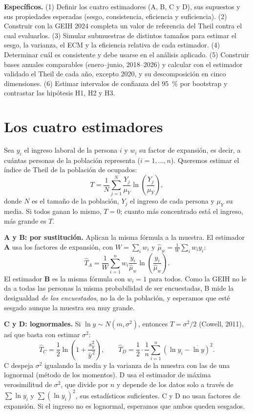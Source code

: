 \documentclass[12pt,letterpaper]{article}
\begin{document}
\textbf{Específicos.} (1) Definir los cuatro estimadores (A, B, C y D), sus supuestos y sus propiedades esperadas (sesgo, consistencia, eficiencia y suficiencia). (2) Construir con la GEIH 2024 completa un valor de referencia del Theil contra el cual evaluarlos. (3) Simular submuestras de distintos tamaños para estimar el sesgo, la varianza, el ECM y la eficiencia relativa de cada estimador. (4) Determinar cuál es consistente y debe usarse en el análisis aplicado. (5) Construir bases anuales comparables (enero--junio, 2018--2026) y calcular con el estimador validado el Theil de cada año, excepto 2020, y su descomposición en cinco dimensiones. (6) Estimar intervalos de confianza del 95~\% por bootstrap y contrastar las hipótesis H1, H2 y H3.

\section{Los cuatro estimadores}

Sea $y_i$ el ingreso laboral de la persona $i$ y $w_i$ su factor de expansión, es decir, a cuántas personas de la población representa ($i = 1, \dots, n$). Queremos estimar el índice de Theil de la población de ocupados:
\begin{equation}
  T = \frac{1}{N}\sum_{j=1}^{N} \frac{Y_j}{\mu_Y}\ln\!\left(\frac{Y_j}{\mu_Y}\right),
\end{equation}
donde $N$ es el tamaño de la población, $Y_j$ el ingreso de cada persona y $\mu_Y$ su media. Si todos ganan lo mismo, $T = 0$; cuanto más concentrado está el ingreso, más grande es $T$.

\textbf{A y B: por sustitución.} Aplican la misma fórmula a la muestra. El estimador \textbf{A} usa los factores de expansión, con $W = \sum_i w_i$ y $\hat{\mu}_w = \frac{1}{W}\sum_i w_i y_i$:
\begin{equation}
  \hat{T}_A = \frac{1}{W}\sum_{i=1}^{n} w_i \frac{y_i}{\hat{\mu}_w}\ln\!\left(\frac{y_i}{\hat{\mu}_w}\right).
\end{equation}
El estimador \textbf{B} es la misma fórmula con $w_i = 1$ para todos. Como la GEIH no le da a todas las personas la misma probabilidad de ser encuestadas, B mide la desigualdad \emph{de los encuestados}, no la de la población, y esperamos que esté sesgado aunque la muestra sea muy grande.

\textbf{C y D: lognormales.} Si $\ln y \sim N(m, \sigma^2)$, entonces $T = \sigma^2/2$ (Cowell, 2011), así que basta con estimar $\sigma^2$:
\begin{equation}
  \hat{T}_C = \frac{1}{2}\ln\!\left(1 + \frac{s_y^2}{\bar{y}^{\,2}}\right),
  \qquad
  \hat{T}_D = \frac{1}{2}\cdot\frac{1}{n}\sum_{i=1}^{n}\left(\ln y_i - \overline{\ln y}\right)^2 .
\end{equation}
C despeja $\sigma^2$ igualando la media y la varianza de la muestra con las de una lognormal (método de los momentos). D usa el estimador de máxima verosimilitud de $\sigma^2$, que divide por $n$ y depende de los datos solo a través de $\sum \ln y_i$ y $\sum (\ln y_i)^2$, sus estadísticos suficientes. C y D no usan factores de expansión. Si el ingreso no es lognormal, esperamos que ambos queden sesgados.
\end{document}
